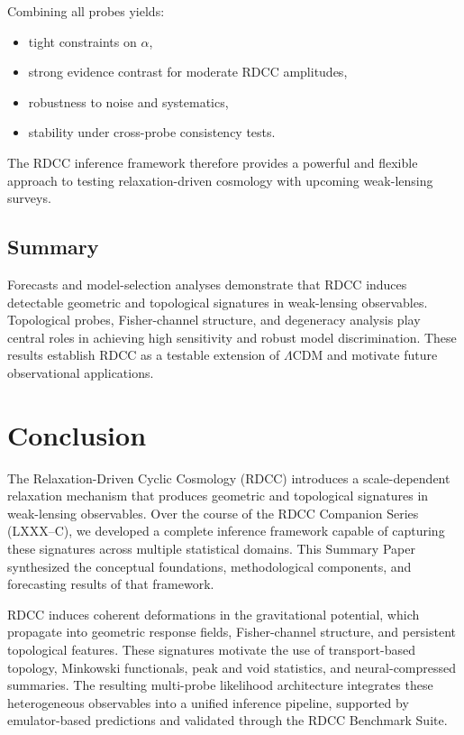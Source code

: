 \documentclass[11pt,a4paper]{article}
\begin{document}
Combining all probes yields:

\begin{itemize}
    \item tight constraints on $\alpha$,
    \item strong evidence contrast for moderate RDCC amplitudes,
    \item robustness to noise and systematics,
    \item stability under cross-probe consistency tests.
\end{itemize}

The RDCC inference framework therefore provides a powerful and flexible approach
to testing relaxation-driven cosmology with upcoming weak-lensing surveys.

\subsection{Summary}

Forecasts and model-selection analyses demonstrate that RDCC induces detectable
geometric and topological signatures in weak-lensing observables. Topological
probes, Fisher-channel structure, and degeneracy analysis play central roles in
achieving high sensitivity and robust model discrimination. These results
establish RDCC as a testable extension of $\Lambda$CDM and motivate future
observational applications.


\section{Conclusion}

The Relaxation-Driven Cyclic Cosmology (RDCC) introduces a scale-dependent
relaxation mechanism that produces geometric and topological signatures in
weak-lensing observables. Over the course of the RDCC Companion Series
(LXXX--C), we developed a complete inference framework capable of capturing
these signatures across multiple statistical domains. This Summary Paper
synthesized the conceptual foundations, methodological components, and
forecasting results of that framework.

RDCC induces coherent deformations in the gravitational potential, which
propagate into geometric response fields, Fisher-channel structure, and
persistent topological features. These signatures motivate the use of
transport-based topology, Minkowski functionals, peak and void statistics, and
neural-compressed summaries. The resulting multi-probe likelihood architecture
integrates these heterogeneous observables into a unified inference pipeline,
supported by emulator-based predictions and validated through the RDCC
Benchmark Suite.
\end{document}
